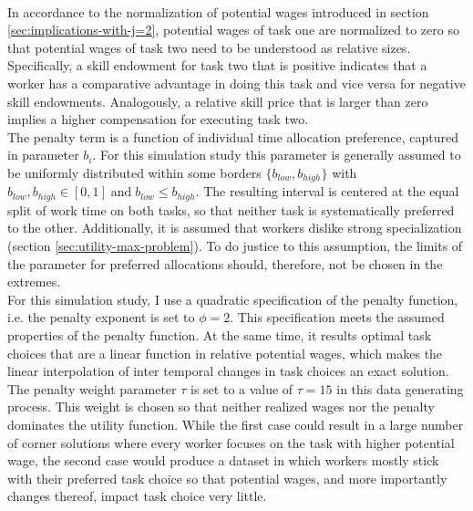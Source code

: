\documentclass[../main.tex]{subfiles}
\begin{document}
\\
In accordance to the normalization of potential wages introduced in section \ref{sec:implications-with-j=2}, potential wages of task one are normalized to zero so that potential wages of task two need to be understood as relative sizes. Specifically, a skill endowment for task two that is positive indicates that a worker has a comparative advantage in doing this task and vice versa for negative skill endowments. Analogously, a relative skill price that is larger than zero implies a higher compensation for executing task two.
\\
The penalty term is a function of individual time allocation preference, captured in parameter $b_i$. For this simulation study this parameter is generally assumed to be uniformly distributed within some borders $\{b_{low}, b_{high}\}$ with $b_{low}, b_{high} \in [0, 1] \; \text{and} \; b_{low} \leq b_{high}$. The resulting interval is centered at the equal split of work time on both tasks, so that neither task is systematically preferred to the other. Additionally, it is assumed that workers dislike strong specialization (section \ref{sec:utility-max-problem}). To do justice to this assumption, the limits of the parameter for preferred allocations should, therefore, not be chosen in the extremes.
\\
For this simulation study, I use a quadratic specification of the penalty function, i.e. the penalty exponent is set to $\phi = 2$. This specification meets  the assumed properties of the penalty function. 
At the same time, it results optimal task choices that are a linear function in relative potential wages, which makes the linear interpolation of inter temporal changes in task choices an exact solution. The penalty weight parameter $\tau$ is set to a value of $\tau = 15$ in this data generating process. This weight is chosen so that neither realized wages nor the penalty dominates the utility function.
While the first case could result in a large number of corner solutions where every worker focuses on the task with higher potential wage, the second case would produce a dataset in which workers mostly stick with their preferred task choice so that potential wages, and more importantly changes thereof, impact task choice very little.
\end{document}
